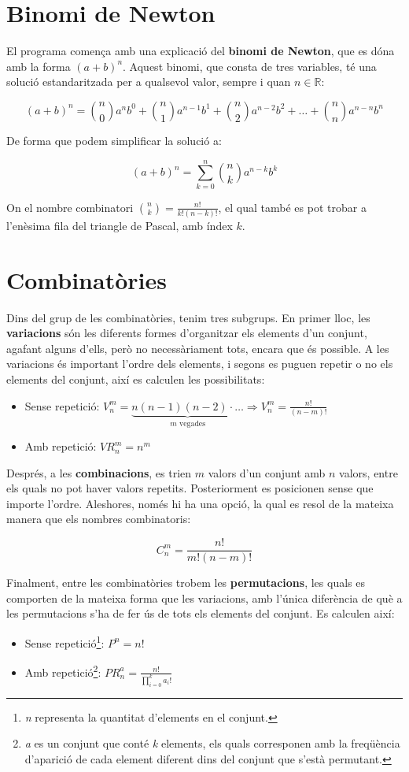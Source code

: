 \documentclass[12pt,a4paper]{article}
\begin{document}
\section{Binomi de Newton}
El programa comença amb una explicació del \textbf{binomi de Newton}, que es dóna amb la forma \((a+b)^n\). Aquest binomi, que consta de tres variables, té una solució estandaritzada per a qualsevol valor, sempre i quan \(n \in \mathbb{R}\):

\[
	(a+b)^n = \binom{n}{0}a^n b^0 + \binom{n}{1}a^{n-1} b^1 + \binom{n}{2}a^{n-2} b^2 + \dots + \binom{n}{n}a^{n-n} b^n
\]

De forma que podem simplificar la solució a:

\[
	(a+b)^n = \sum_{k = 0}^{n} \binom{n}{k}a^{n-k} b^k
\]

On el nombre combinatori \(\binom{n}{k} = \frac{n!}{k! (n-k)!}\), el qual també es pot trobar a l'enèsima fila del triangle de Pascal, amb índex \(k\).

\section{Combinatòries}
Dins del grup de les combinatòries, tenim tres subgrups. En primer lloc, les \textbf{variacions} són les diferents formes d'organitzar els elements d'un conjunt, agafant alguns d'ells, però no necessàriament tots, encara que és possible. A les variacions és important l'ordre dels elements, i segons es puguen repetir o no els elements del conjunt, així es calculen les possibilitats:\\
\begin{itemize}
	\item Sense repetició: \(V_{n}^{m} = \underbrace{n(n-1)(n-2)\cdot\dots}_{m\text{ vegades}} \Rightarrow V_{n}^{m} = \frac{n!}{(n-m)!}\)
	\item Amb repetició: \(VR_{n}^{m} = n^m\)
\end{itemize}

Després, a les \textbf{combinacions}, es trien \(m\) valors d'un conjunt amb \(n\) valors, entre els quals no pot haver valors repetits. Posteriorment es posicionen sense que importe l'ordre. Aleshores, només hi ha una opció, la qual es resol de la mateixa manera que els nombres combinatoris:

\[
	C_{n}^{m} = \frac{n!}{m!(n-m)!}
\]

Finalment, entre les combinatòries trobem les \textbf{permutacions}, les quals es comporten de la mateixa forma que les variacions, amb l'única diferència de què a les permutacions s'ha de fer ús de tots els elements del conjunt. Es calculen així:
\begin{itemize}
	\item Sense repetició\footnote{\textit{n} representa la quantitat d'elements en el conjunt.}: \(P^n = n!\)
	\item Amb repetició\footnote{\textit{a} es un conjunt que conté \textit{k} elements, els quals corresponen amb la freqüència d'aparició de cada element diferent dins del conjunt que s'està permutant.}: \(PR_{n}^{a} = \frac{n!}{\prod_{i=0}^{k} a_{i}!}\)
\end{itemize}
\end{document}
